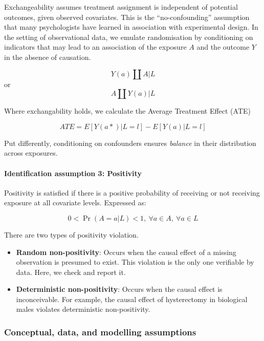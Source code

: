 \documentclass[
  singlecolumn]{article}
\let\oldparagraph\paragraph
\renewcommand{\paragraph}[1]{\oldparagraph{#1}\mbox{}}
\begin{document}
Exchangeability assumes treatment assignment is independent of potential
outcomes, given observed covariates. This is the ``no-confounding''
assumption that many psychologists have learned in association with
experimental design. In the setting of observational data, we emulate
randomisation by conditioning on indicators that may lead to an
association of the exposure \(A\) and the outcome \(Y\) in the absence
of causation.

\[Y(a)\coprod  A|L\] or \[A \coprod  Y(a)|L\]

Where exchangability holds, we calculate the Average Treatment Effect
(ATE)

\[
ATE = E[Y(a*)|L = l] - E[Y(a)|L = l] 
\]

Put differently, conditioning on confounders ensures \emph{balance} in
their distribution across exposures.

\paragraph{Identification assumption 3:
Positivity}\label{identification-assumption-3-positivity}

Positivity is satisfied if there is a positive probability of receiving
or not receiving exposure at all covariate levels. Expressed as:

\begin{equation}
0 < \Pr(A=a|L)<1, ~ \forall a \in A, ~ \forall a \in L
\end{equation}

There are two types of positivity violation.

\begin{itemize}
\item
  \textbf{Random non-positivity}: Occurs when the causal effect of a
  missing observation is presumed to exist. This violation is the only
  one verifiable by data. Here, we check and report it.
\item
  \textbf{Deterministic non-positivity}: Occurs when the causal effect
  is inconceivable. For example, the causal effect of hysterectomy in
  biological males violates deterministic non-positivity.
\end{itemize}

\subsubsection{Conceptual, data, and modelling
assumptions}\label{conceptual-data-and-modelling-assumptions}
\end{document}
